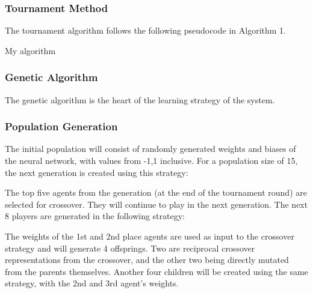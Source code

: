 \documentclass[12pt,a4paper]{article}
\makeatletter
\def\BState{\State\hskip-\ALG@thistlm}
\makeatother
\begin{document}
\subsubsection{Tournament Method}

The tournament algorithm follows the following pseudocode in Algorithm 1.

\begin{algorithm}
    \caption{My algorithm}\label{euclid}
\end{algorithm}

\subsubsection{Genetic Algorithm}

The genetic algorithm is the heart of the learning strategy of the system. 

\subsubsection{Population Generation}

The initial population will consist of randomly generated weights and biases of the neural network, with values from -1,1 inclusive. For a population size of 15, the next generation is created using this strategy:

The top five agents from the generation (at the end of the tournament round) are selected for crossover. They will continue to play in the next generation.
The next 8 players are generated in the following strategy:

The weights of the 1st and 2nd place agents are used as input to the crossover strategy and will generate 4 offsprings. Two are reciprocal crossover representations from the crossover, and the other two being directly mutated from the parents themselves. Another four children will be created using the same strategy, with the 2nd and 3rd agent's weights. 
\end{document}
